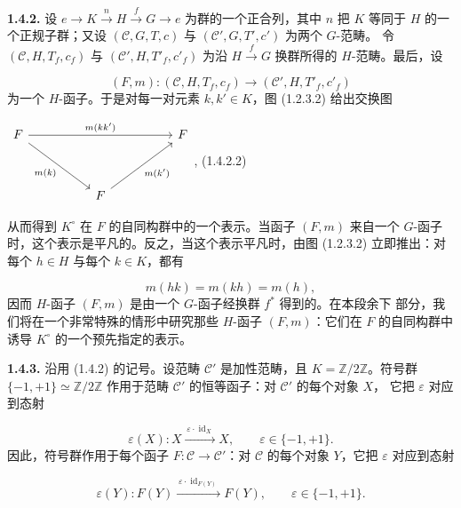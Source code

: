 \clearpage
{}%
\noindent\textbf{1.4.2.}\quad
设
$e\to K\xrightarrow{n}H\xrightarrow{f}G\to e$
为群的一个正合列，其中 $n$ 把 $K$ 等同于 $H$ 的一个正规子群；又设
$(\mathcal C,G,T,c)$ 与 $(\mathcal C',G,T',c')$ 为两个 $G$-范畴。
令 $(\mathcal C,H,T_f,c_f)$ 与 $(\mathcal C',H,T'_f,c'_f)$ 为沿
$H\xrightarrow{f}G$ 换群所得的 $H$-范畴。最后，设

\begin{equation}
  (F,m)\colon(\mathcal C,H,T_f,c_f)
  \longrightarrow(\mathcal C',H,T'_f,c'_f)
  \tag{1.4.2.1}
\end{equation}
为一个 $H$-函子。于是对每一对元素 $k,k'\in K$，图 (1.2.3.2) 给出交换图

\begin{center}
  $\begin{tikzcd}[ampersand replacement=\&,column sep=5em,row sep=3.5em]
    F \arrow[rr,"{m(kk')}"] \arrow[dr,"{m(k)}"']
      \& \& F \\
      \& F \arrow[ur,"{m(k')}"'] \&
  \end{tikzcd}$,
  \hfill\textup{(1.4.2.2)}
\end{center}

从而得到 $K^\circ$ 在 $F$ 的自同构群中的一个表示。当函子 $(F,m)$ 来自一个
$G$-函子时，这个表示是平凡的。反之，当这个表示平凡时，由图 (1.2.3.2)
立即推出：对每个 $h\in H$ 与每个 $k\in K$，都有

\begin{equation}
  m(hk)=m(kh)=m(h),
  \tag{1.4.2.3}
\end{equation}
因而 $H$-函子 $(F,m)$ 是由一个 $G$-函子经换群 $f^*$ 得到的。在本段余下
部分，我们将在一个非常特殊的情形中研究那些 $H$-函子 $(F,m)$：它们在
$F$ 的自同构群中诱导 $K^\circ$ 的一个预先指定的表示。

\noindent\textbf{1.4.3.}\quad
沿用 (1.4.2) 的记号。设范畴 $\mathcal C'$ 是加性范畴，且
$K=\mathbb Z/2\mathbb Z$。符号群
$\{-1,+1\}\simeq\mathbb Z/2\mathbb Z$
作用于范畴 $\mathcal C'$ 的恒等函子：对 $\mathcal C'$ 的每个对象 $X$，
它把 $\varepsilon$ 对应到态射

\begin{equation}
  \varepsilon(X)\colon
  X\xrightarrow{\,\varepsilon\cdot\operatorname{id}_X\,}X,
  \qquad \varepsilon\in\{-1,+1\}.
  \tag{1.4.3.1}
\end{equation}
因此，符号群作用于每个函子 $F\colon\mathcal C\to\mathcal C'$：对
$\mathcal C$ 的每个对象 $Y$，它把 $\varepsilon$ 对应到态射

\begin{equation}
  \varepsilon(Y)\colon
  F(Y)\xrightarrow{\,\varepsilon\cdot\operatorname{id}_{F(Y)}\,}F(Y),
  \qquad \varepsilon\in\{-1,+1\}.
  \tag{1.4.3.2}
\end{equation}
